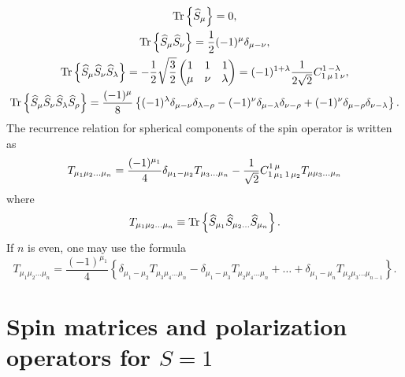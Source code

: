 \begin{gather}
\operatorname{Tr} \left\{\widehat{S}_{\mu}\right\}=0,  \notag\\
\operatorname{Tr} \left\{\widehat{S}_{\mu} \widehat{S}_{\nu}\right\}=\frac{1}{2}(-1)^{\mu} \delta_{\mu-\nu},  \notag\\
\operatorname{Tr} \left\{\widehat{S}_{\mu} \widehat{S}_{\nu} \widehat{S}_{\lambda}\right\}=-\frac{1}{2} \sqrt{\frac{3}{2}}\begin{pmatrix}
1 & 1 & 1 \\
\mu & \nu & \lambda
\end{pmatrix}=(-1)^{1+\lambda} \frac{1}{2 \sqrt{2}} C_{1\,\mu\,1\,\nu}^{1\,-\lambda},  \label{eq:2:5:46}\\
\operatorname{Tr} \left\{\widehat{S}_{\mu} \widehat{S}_{\nu} \widehat{S}_{\lambda} \widehat{S}_{\rho}\right\}=\frac{(-1)^{\mu}}{8}\left\{(-1)^{\lambda} \delta_{\mu-\nu} \delta_{\lambda-\rho}-(-1)^{\nu} \delta_{\mu-\lambda} \delta_{\nu-\rho}+(-1)^{\nu} \delta_{\mu-\rho} \delta_{\nu-\lambda}\right\} . \notag
\end{gather}
The recurrence relation for spherical components of the spin operator is written as
\begin{equation}
T_{\mu_{1} \mu_{2} \ldots \mu_{n}}=\frac{(-1)^{\mu_{1}}}{4} \delta_{\mu_{1}-\mu_{2}} T_{\mu_{3} \ldots \mu_{n}}-\frac{1}{\sqrt{2}} C_{1\,\mu_{1}\,1\,\mu_{2}}^{1\,\mu} T_{\mu \mu_{3} \ldots \mu_{n}} \label{eq:2:5:47}
\end{equation}
where
\begin{equation}
T_{\mu_{1} \mu_{2} \ldots \mu_{n}} \equiv \operatorname{Tr} \left\{\widehat{S}_{\mu_{1}} \widehat{S}_{\mu_{2} \ldots} \widehat{S}_{\mu_{n}}\right\}. \label{eq:2:5:48}
\end{equation}
If $n$ is even, one may use the formula
\begin{equation}
T_{\mu_{1} \mu_{2} \ldots \mu_{n}}=\frac{(-1)^{\mu_{1}}}{4}\left\{\delta_{\mu_{1}-\mu_{2}} T_{\mu_{3} \mu_{4} \ldots \mu_{n}}-\delta_{\mu_{1}-\mu_{3}} T_{\mu_{2} \mu_{4} \ldots \mu_{n}}+\ldots+\delta_{\mu_{1}-\mu_{n}} T_{\mu_{2} \mu_{3} \ldots \mu_{n-1}}\right\}. \label{eq:2:5:49}
\end{equation}
\section{Spin matrices and polarization operators for $S=1$}\label{sec:2.6}
